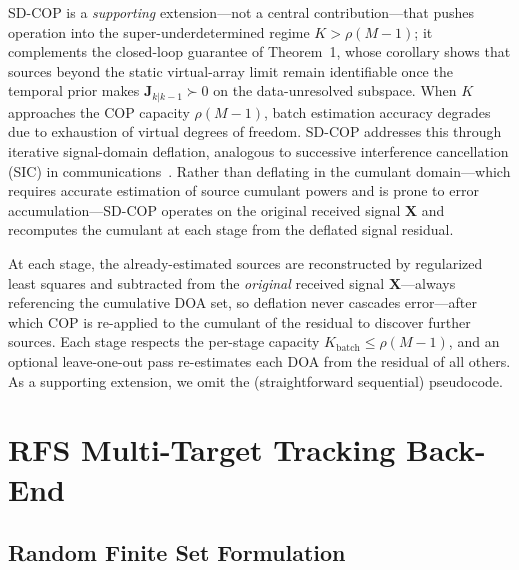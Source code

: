 \documentclass[journal]{IEEEtran}
\newcommand{\mat}[1]{\mathbf{#1}}
\begin{document}
SD-COP is a \emph{supporting} extension---not a central contribution---that pushes operation into the super-underdetermined regime $K>\rho(M{-}1)$; it complements the closed-loop guarantee of Theorem~1, whose corollary shows that sources beyond the static virtual-array limit remain identifiable once the temporal prior makes $\mat{J}_{k|k-1}\succ0$ on the data-unresolved subspace. When $K$ approaches the COP capacity $\rho(M-1)$, batch estimation accuracy degrades due to exhaustion of virtual degrees of freedom. SD-COP addresses this through iterative signal-domain deflation, analogous to successive interference cancellation (SIC) in communications~\cite{andrews2005sic}. Rather than deflating in the cumulant domain---which requires accurate estimation of source cumulant powers and is prone to error accumulation---SD-COP operates on the original received signal $\mat{X}$ and recomputes the cumulant at each stage from the deflated signal residual.

At each stage, the already-estimated sources are reconstructed by regularized least squares and subtracted from the \emph{original} received signal $\mat{X}$---always referencing the cumulative DOA set, so deflation never cascades error---after which COP is re-applied to the cumulant of the residual to discover further sources. Each stage respects the per-stage capacity $K_{\mathrm{batch}}\le\rho(M{-}1)$, and an optional leave-one-out pass re-estimates each DOA from the residual of all others. As a supporting extension, we omit the (straightforward sequential) pseudocode.

\section{RFS Multi-Target Tracking Back-End}
\label{sec:tracking}

\subsection{Random Finite Set Formulation}
\end{document}
